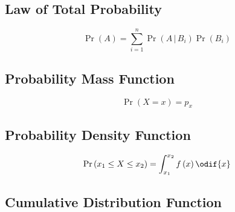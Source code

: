 \documentclass{article}
\begin{document}
\begin{multicols}{3}
    \subsection{Law of Total Probability}
    \begin{equation*}
        \Pr{\left( A \right)} = \sum_{i = 1}^n \Pr{\left( A \,\vert\, B_i \right)}\Pr{\left( B_i \right)}
    \end{equation*}
    \subsection{Probability Mass Function}
    \begin{equation*}
        \Pr{\left( X = x \right)} = p_x
    \end{equation*}
    \subsection{Probability Density Function}
    \begin{equation*}
        \Pr{\left( x_1 \leq X \leq x_2 \right)} = \int_{x_1}^{x_2} f\left( x \right) \odif{x}
    \end{equation*}
    \subsection{Cumulative Distribution Function}


\end{multicols}
\end{document}
